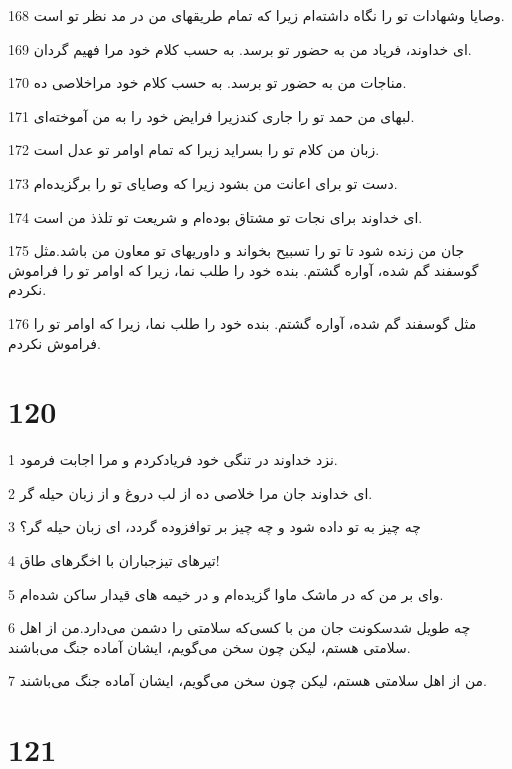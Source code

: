 \par 168 وصایا وشهادات تو را نگاه داشته‌ام زیرا که تمام طریقهای من در مد نظر تو است.
\par 169 ‌ای خداوند، فریاد من به حضور تو برسد. به حسب کلام خود مرا فهیم گردان.
\par 170 مناجات من به حضور تو برسد. به حسب کلام خود مراخلاصی ده.
\par 171 لبهای من حمد تو را جاری کندزیرا فرایض خود را به من آموخته‌ای.
\par 172 زبان من کلام تو را بسراید زیرا که تمام اوامر تو عدل است.
\par 173 دست تو برای اعانت من بشود زیرا که وصایای تو را برگزیده‌ام.
\par 174 ‌ای خداوند برای نجات تو مشتاق بوده‌ام و شریعت تو تلذذ من است.
\par 175 جان من زنده شود تا تو را تسبیح بخواند و داوریهای تو معاون من باشد.مثل گوسفند گم شده، آواره گشتم. بنده خود را طلب نما، زیرا که اوامر تو را فراموش نکردم.
\par 176 مثل گوسفند گم شده، آواره گشتم. بنده خود را طلب نما، زیرا که اوامر تو را فراموش نکردم.
 
\chapter{120}

\par 1 نزد خداوند در تنگی خود فریادکردم و مرا اجابت فرمود.
\par 2 ‌ای خداوند جان مرا خلاصی ده از لب دروغ و از زبان حیله گر.
\par 3 چه چیز به تو داده شود و چه چیز بر توافزوده گردد، ای زبان حیله گر؟
\par 4 تیرهای تیزجباران با اخگرهای طاق!
\par 5 وای بر من که در ماشک ماوا گزیده‌ام و در خیمه های قیدار ساکن شده‌ام.
\par 6 چه طویل شدسکونت جان من با کسی‌که سلامتی را دشمن می‌دارد.من از اهل سلامتی هستم، لیکن چون سخن می‌گویم، ایشان آماده جنگ می‌باشند.
\par 7 من از اهل سلامتی هستم، لیکن چون سخن می‌گویم، ایشان آماده جنگ می‌باشند.
 
\chapter{121}

